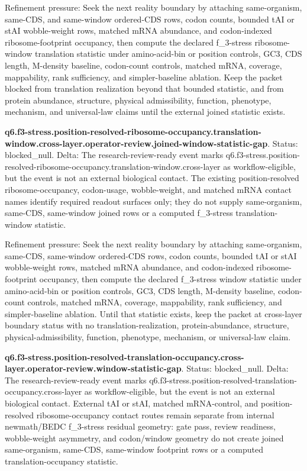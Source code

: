Refinement pressure: Seek the next reality boundary by attaching same-organism, same-CDS, and same-window ordered-CDS rows, codon counts, bounded tAI or stAI wobble-weight rows, matched mRNA abundance, and codon-indexed ribosome-footprint occupancy, then compute the declared f\_3-stress ribosome-window translation statistic under amino-acid-bin or position controls, GC3, CDS length, M-density baseline, codon-count controls, matched mRNA, coverage, mappability, rank sufficiency, and simpler-baseline ablation. Keep the packet blocked from translation realization beyond that bounded statistic, and from protein abundance, structure, physical admissibility, function, phenotype, mechanism, and universal-law claims until the external joined statistic exists.

\textbf{q6.f3-stress.position-resolved-ribosome-occupancy.translation-window.cross-layer.operator-review.joined-window-statistic-gap}. Status: blocked\_null. Delta: The research-review-ready event marks q6.f3-stress.position-resolved-ribosome-occupancy.translation-window.cross-layer as workflow-eligible, but the event is not an external biological contact. The existing position-resolved ribosome-occupancy, codon-usage, wobble-weight, and matched mRNA contact names identify required readout surfaces only; they do not supply same-organism, same-CDS, same-window joined rows or a computed f\_3-stress translation-window statistic.

Refinement pressure: Seek the next reality boundary by attaching same-organism, same-CDS, same-window ordered-CDS rows, codon counts, bounded tAI or stAI wobble-weight rows, matched mRNA abundance, and codon-indexed ribosome-footprint occupancy, then compute the declared f\_3-stress window statistic under amino-acid-bin or position controls, GC3, CDS length, M-density baseline, codon-count controls, matched mRNA, coverage, mappability, rank sufficiency, and simpler-baseline ablation. Until that statistic exists, keep the packet at cross-layer boundary status with no translation-realization, protein-abundance, structure, physical-admissibility, function, phenotype, mechanism, or universal-law claim.

\textbf{q6.f3-stress.position-resolved-translation-occupancy.cross-layer.operator-review.window-statistic-gap}. Status: blocked\_null. Delta: The research-review-ready event marks q6.f3-stress.position-resolved-translation-occupancy.cross-layer as workflow-eligible, but the event is not an external biological contact. External tAI or stAI, matched mRNA-control, and position-resolved ribosome-occupancy contact routes remain separate from internal newmath/BEDC f\_3-stress residual geometry: gate pass, review readiness, wobble-weight asymmetry, and codon/window geometry do not create joined same-organism, same-CDS, same-window footprint rows or a computed translation-occupancy statistic.

